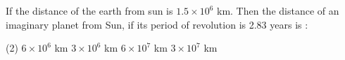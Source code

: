 \item If the distance of the earth from sun is \( 1.5 \times 10^6 \) km. Then the distance of an imaginary planet from Sun, if its period of revolution is 2.83 years is :
    \begin{tasks}(2)
        \task \( 6 \times 10^6 \) km
        \task \( 3 \times 10^6 \) km
        \task \( 6 \times 10^7 \) km
        \task \( 3 \times 10^7 \) km
    \end{tasks}